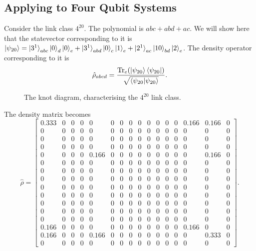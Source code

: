 \documentclass{scrartcl}
\begin{document}
\subsection{Applying to Four Qubit Systems}
Consider the link class $4^{20}$. The polynomial is $abc+ abd + ac$. We will show here that the statevector corresponding to it is $\ket{\psi_{20}} = \ket{3^1}_{abc}\ket{0}_{d} \ket{0}_e + \ket{3^1}_{abd} \ket{0}_c \ket{1}_e + \ket{2^1}_{ac} \ket{10}_{bd} \ket{2}_e$. The density operator corresponding to it is 
\begin{equation*}
	\hat{\rho}_{abcd} = \frac{\Tr_e( \ket{\psi_{20}}\bra{\psi_{20}})}{\sqrt{\braket{\psi_{20}|\psi_{20}} }}.
\end{equation*}
\begin{figure}[H]
    \centering
    \scalebox{0.7}{ }
    \caption{The knot diagram, characterising the $4^{20}$ link class.}
\end{figure}
The density matrix becomes 
\begin{equation*}
	\hat{\rho} = \left[\begin{array}{cccccccccccccccc}0.333 & 0 & 0 & 0 & 0 & 0 & 0 & 0 & 0 & 0 & 0 & 0 & 0 & 0.166 & 0.166 & 0\\0 & 0 & 0 & 0 & 0 & 0 & 0 & 0 & 0 & 0 & 0 & 0 & 0 & 0 & 0 & 0\\0 & 0 & 0 & 0 & 0 & 0 & 0 & 0 & 0 & 0 & 0 & 0 & 0 & 0 & 0 & 0\\0 & 0 & 0 & 0 & 0 & 0 & 0 & 0 & 0 & 0 & 0 & 0 & 0 & 0 & 0 & 0\\0 & 0 & 0 & 0 & 0.166 & 0 & 0 & 0 & 0 & 0 & 0 & 0 & 0 & 0 & 0.166 & 0\\0 & 0 & 0 & 0 & 0 & 0 & 0 & 0 & 0 & 0 & 0 & 0 & 0 & 0 & 0 & 0\\0 & 0 & 0 & 0 & 0 & 0 & 0 & 0 & 0 & 0 & 0 & 0 & 0 & 0 & 0 & 0\\0 & 0 & 0 & 0 & 0 & 0 & 0 & 0 & 0 & 0 & 0 & 0 & 0 & 0 & 0 & 0\\0 & 0 & 0 & 0 & 0 & 0 & 0 & 0 & 0 & 0 & 0 & 0 & 0 & 0 & 0 & 0\\0 & 0 & 0 & 0 & 0 & 0 & 0 & 0 & 0 & 0 & 0 & 0 & 0 & 0 & 0 & 0\\0 & 0 & 0 & 0 & 0 & 0 & 0 & 0 & 0 & 0 & 0 & 0 & 0 & 0 & 0 & 0\\0 & 0 & 0 & 0 & 0 & 0 & 0 & 0 & 0 & 0 & 0 & 0 & 0 & 0 & 0 & 0\\0 & 0 & 0 & 0 & 0 & 0 & 0 & 0 & 0 & 0 & 0 & 0 & 0 & 0 & 0 & 0\\0.166 & 0 & 0 & 0 & 0 & 0 & 0 & 0 & 0 & 0 & 0 & 0 & 0 & 0.166 & 0 & 0\\0.166 & 0 & 0 & 0 & 0.166 & 0 & 0 & 0 & 0 & 0 & 0 & 0 & 0 & 0 & 0.333 & 0\\0 & 0 & 0 & 0 & 0 & 0 & 0 & 0 & 0 & 0 & 0 & 0 & 0 & 0 & 0 & 0\end{array}\right]
	.
\end{equation*}
\end{document}

